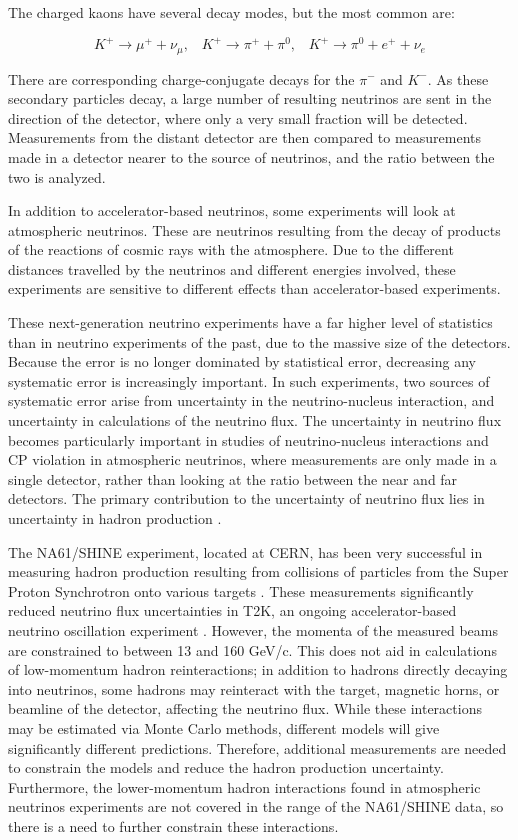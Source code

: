 The charged kaons have several decay modes, but the most common are:

\begin{equation}
K^+ \rightarrow \mu^+ + \nu_\mu \text{,} \quad  K^+ \rightarrow \pi^+ + \pi^0  \text{,}\quad K^+ \rightarrow \pi^0 + e^+ + \nu_e
\end{equation}

There are corresponding charge-conjugate decays for the $\pi^-$ and $K^-$. 
As these secondary particles decay, a large number of resulting neutrinos are sent in the direction of the detector, where only a very small fraction will be detected.
Measurements from the distant detector are then compared to measurements made in a detector nearer to the source of neutrinos, and the ratio between the two is analyzed.

In addition to accelerator-based neutrinos, some experiments will look at atmospheric neutrinos.
These are neutrinos resulting from the decay of products of the reactions of cosmic rays with the atmosphere. 
Due to the different distances travelled by the neutrinos and different energies involved, these experiments are sensitive to different effects than accelerator-based experiments.

These next-generation neutrino experiments have a far higher level of statistics than in neutrino experiments of the past, due to the massive size of the detectors.
Because the error is no longer dominated by statistical error, decreasing any systematic error is increasingly important.
In such experiments, two sources of systematic error arise from uncertainty in the neutrino-nucleus interaction, and uncertainty in calculations of the neutrino flux.
The uncertainty in neutrino flux becomes particularly important in studies of neutrino-nucleus interactions and CP violation in atmospheric neutrinos, where measurements are only made in a single detector, rather than looking at the ratio between the near and far detectors. 
The primary contribution to the uncertainty of neutrino flux lies in uncertainty in hadron production \cite{hyperKDesign}.


The NA61/SHINE experiment, located at CERN, has been very successful in measuring hadron production resulting from collisions of particles from the Super Proton Synchrotron onto various targets \cite{na61}.
These measurements significantly reduced neutrino flux uncertainties in T2K, an ongoing accelerator-based neutrino oscillation experiment \cite{na61T2K}. 
However, the momenta of the measured beams are constrained to between 13 and 160 GeV/c.
This does not aid in calculations of low-momentum hadron reinteractions; in addition to hadrons directly decaying into neutrinos, some hadrons may reinteract with the target, magnetic horns, or beamline of the detector, affecting the neutrino flux.
While these interactions may be estimated via Monte Carlo methods, different models will give significantly different predictions. Therefore, additional measurements are needed to constrain the models and reduce the hadron production uncertainty. Furthermore, the lower-momentum hadron interactions found in atmospheric neutrinos experiments are not covered in the range of the NA61/SHINE data, so there is a need to further constrain these interactions.

